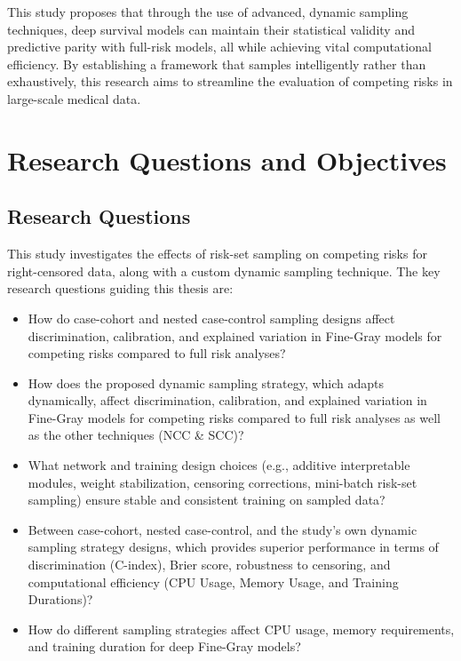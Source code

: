 \documentclass[a4paper,twoside,12pt]{report}
\begin{document}
This study proposes that through the use of advanced, dynamic sampling techniques, deep survival models can maintain their statistical validity and predictive parity with full-risk models, all while achieving vital computational efficiency. By establishing a framework that samples intelligently rather than exhaustively, this research aims to streamline the evaluation of competing risks in large-scale medical data.

\section{Research Questions and Objectives}

\subsection{Research Questions}
This study investigates the effects of risk-set sampling on competing risks for right-censored data, along with a custom dynamic sampling technique. The key research questions guiding this thesis are:
\begin{itemize}
    \item How do case-cohort and nested case-control sampling designs affect discrimination, calibration, and explained variation in Fine-Gray models for competing risks compared to full risk analyses?
    \item How does the proposed dynamic sampling strategy, which adapts dynamically, affect discrimination, calibration, and explained variation in Fine-Gray models for competing risks compared to full risk analyses as well as the other techniques (NCC \& SCC)?
    \item What network and training design choices (e.g., additive interpretable modules, weight stabilization, censoring corrections, mini-batch risk-set sampling) ensure stable and consistent training on sampled data?
    \item Between case-cohort, nested case-control, and the study's own dynamic sampling strategy designs, which provides superior performance in terms of discrimination (C-index), Brier score, robustness to censoring, and computational efficiency (CPU Usage, Memory Usage, and Training Durations)?
    \item How do different sampling strategies affect CPU usage, memory requirements, and training duration for deep Fine-Gray models?
\end{itemize}
\end{document}
